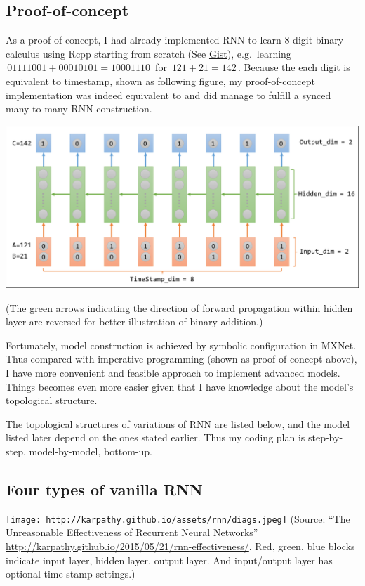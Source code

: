 \documentclass[]{article}
\begin{document}
\subsection{Proof-of-concept}\label{proof-of-concept}

As a proof of concept, I had already implemented RNN to learn 8-digit
binary calculus using Rcpp starting from scratch (See
\href{https://gist.github.com/Puriney/072a37ea8a181f0b6168}{Gist}),
e.g.~learning \(\,01111001 + 00010101 = 10001110\,\) for
\(\,121+21=142\,\). Because the each digit is equivalent to timestamp,
shown as following figure, my proof-of-concept implementation was indeed
equivalent to and did manage to fulfill a synced many-to-many RNN
construction.

\includegraphics{resources/C911FF3D7C7E860A4082232496BDC508.png}

(The green arrows indicating the direction of forward propagation within
hidden layer are reversed for better illustration of binary addition.)

Fortunately, model construction is achieved by symbolic configuration in
MXNet. Thus compared with imperative programming (shown as
proof-of-concept above), I have more convenient and feasible approach to
implement advanced models. Things becomes even more easier given that I
have knowledge about the model's topological structure.

The topological structures of variations of RNN are listed below, and
the model listed later depend on the ones stated earlier. Thus my coding
plan is step-by-step, model-by-model, bottom-up.

\subsection{Four types of vanilla RNN}\label{four-types-of-vanilla-rnn}

\texttt{[image: http://karpathy.github.io/assets/rnn/diags.jpeg]}
(Source: ``The Unreasonable Effectiveness of Recurrent Neural Networks''
\url{http://karpathy.github.io/2015/05/21/rnn-effectiveness/}. Red,
green, blue blocks indicate input layer, hidden layer, output layer. And
input/output layer has optional time stamp settings.)
\end{document}
